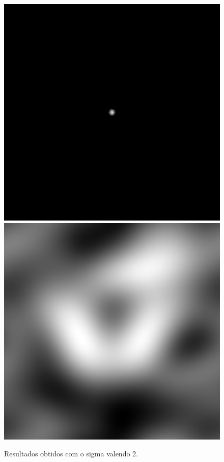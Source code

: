 \documentclass[twoside,twocolumn]{article}
\begin{document}
\begin{figure}[H]
\begin{center}
	\includegraphics[scale=.19]{figures/butterfly_mag_filter_2.png}
	\includegraphics[scale=.19]{figures/butterfly_result_2.png}
\caption{Resultados obtidos com o sigma valendo 2.} \label{mag_64}
\end{center}
\end{figure}
\end{document}
